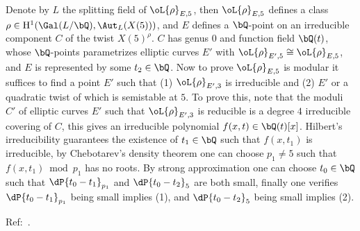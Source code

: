 \documentclass[a4paper, twoside]{article}
\begin{document}
\begin{prf}
	Denote by $L$ the splitting field of $\oL{\rho}_{E,5}$, then $\oL{\rho}_{E,5}$ defines a class $\rho\in \mathrm{H}_{}^{1}(\Gal(L/\bQ),\Aut_{L}(X(5)))$, and $E$ defines a $\bQ$-point on an irreducible component $C$ of the twist $X(5)^{\rho}$. $C$ has genus $0$ and function field $\bQ(t)$, whose $\bQ$-points parametrizes elliptic curves $E'$ with $\oL{\rho}_{E',5}\cong\oL{\rho}_{E,5}$, and $E$ is represented by some $t_{2}\in\bQ$. Now to prove $\oL{\rho}_{E,5}$ is modular it suffices to find a point $E'$ such that (1) $\oL{\rho}_{E',3}$ is irreducible and (2) $E'$ or a quadratic twist of which is semistable at $5$. To prove this, note that the moduli $C'$ of elliptic curves $E'$ such that $\oL{\rho}_{E',3}$ is reducible is a degree $4$ irreducible covering of $C$, this gives an irreducible polynomial $f(x,t)\in\bQ(t)[x]$. Hilbert's irreducibility guarantees the existence of $t_{1}\in\bQ$ such that $f(x,t_{1})$ is irreducible, by Chebotarev's density theorem one can choose $p_{1}\neq5$ such that $f(x,t_{1})\bmod{p_{1}}$ has no roots. By strong approximation one can choose $t_{0}\in\bQ$ such that $\dP{t_{0}-t_{1}}_{p_{1}}$ and $\dP{t_{0}-t_{2}}_{5}$ are both small, finally one verifies $\dP{t_{0}-t_{1}}_{p_{1}}$ being small implies (1), and $\dP{t_{0}-t_{2}}_{5}$ being small implies (2).
\end{prf}




Ref:~\cite{GZ1986}.

\end{document}
